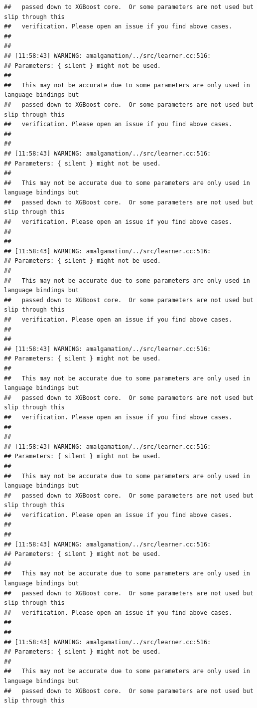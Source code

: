 \documentclass[AMS,STIX2COL]{WileyNJD-v2}\usepackage[]{graphicx}\usepackage[]{color}
\makeatletter
\newenvironment{kframe}{%
 \def\at@end@of@kframe{}%
 \ifinner\ifhmode%
  \def\at@end@of@kframe{\end{minipage}}%
  \begin{minipage}{\columnwidth}%
 \fi\fi%
 \def\FrameCommand##1{\hskip\@totalleftmargin \hskip-\fboxsep
 \colorbox{shadecolor}{##1}\hskip-\fboxsep
     \hskip-\linewidth \hskip-\@totalleftmargin \hskip\columnwidth}%
 \MakeFramed {\advance\hsize-\width
   \@totalleftmargin\z@ \linewidth\hsize
   \@setminipage}}%
 {\par\unskip\endMakeFramed%
 \at@end@of@kframe}
\newenvironment{knitrout}{}{} %
\makeatother
\begin{document}
\begin{knitrout}
\begin{kframe}
\begin{verbatim}
##   passed down to XGBoost core.  Or some parameters are not used but slip through this
##   verification. Please open an issue if you find above cases.
## 
## 
## [11:58:43] WARNING: amalgamation/../src/learner.cc:516: 
## Parameters: { silent } might not be used.
## 
##   This may not be accurate due to some parameters are only used in language bindings but
##   passed down to XGBoost core.  Or some parameters are not used but slip through this
##   verification. Please open an issue if you find above cases.
## 
## 
## [11:58:43] WARNING: amalgamation/../src/learner.cc:516: 
## Parameters: { silent } might not be used.
## 
##   This may not be accurate due to some parameters are only used in language bindings but
##   passed down to XGBoost core.  Or some parameters are not used but slip through this
##   verification. Please open an issue if you find above cases.
## 
## 
## [11:58:43] WARNING: amalgamation/../src/learner.cc:516: 
## Parameters: { silent } might not be used.
## 
##   This may not be accurate due to some parameters are only used in language bindings but
##   passed down to XGBoost core.  Or some parameters are not used but slip through this
##   verification. Please open an issue if you find above cases.
## 
## 
## [11:58:43] WARNING: amalgamation/../src/learner.cc:516: 
## Parameters: { silent } might not be used.
## 
##   This may not be accurate due to some parameters are only used in language bindings but
##   passed down to XGBoost core.  Or some parameters are not used but slip through this
##   verification. Please open an issue if you find above cases.
## 
## 
## [11:58:43] WARNING: amalgamation/../src/learner.cc:516: 
## Parameters: { silent } might not be used.
## 
##   This may not be accurate due to some parameters are only used in language bindings but
##   passed down to XGBoost core.  Or some parameters are not used but slip through this
##   verification. Please open an issue if you find above cases.
## 
## 
## [11:58:43] WARNING: amalgamation/../src/learner.cc:516: 
## Parameters: { silent } might not be used.
## 
##   This may not be accurate due to some parameters are only used in language bindings but
##   passed down to XGBoost core.  Or some parameters are not used but slip through this
##   verification. Please open an issue if you find above cases.
## 
## 
## [11:58:43] WARNING: amalgamation/../src/learner.cc:516: 
## Parameters: { silent } might not be used.
## 
##   This may not be accurate due to some parameters are only used in language bindings but
##   passed down to XGBoost core.  Or some parameters are not used but slip through this

\end{verbatim}
\end{kframe}
\end{knitrout}
\end{document}
